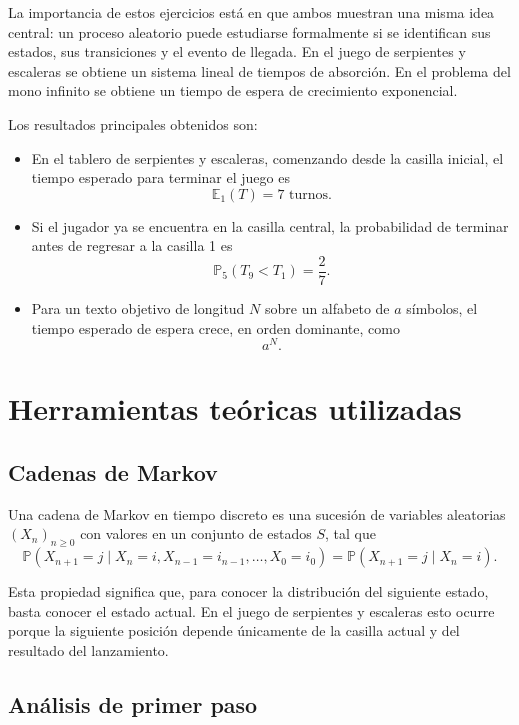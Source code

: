 \documentclass[12pt,a4paper]{article}
\newcommand{\E}{\mathbb{E}}
\newcommand{\Prob}{\mathbb{P}}
\theoremstyle{definition}
\begin{document}
La importancia de estos ejercicios está en que ambos muestran una misma idea central: un proceso aleatorio puede estudiarse formalmente si se identifican sus estados, sus transiciones y el evento de llegada. En el juego de serpientes y escaleras se obtiene un sistema lineal de tiempos de absorción. En el problema del mono infinito se obtiene un tiempo de espera de crecimiento exponencial.

\begin{cajaResumen}
Los resultados principales obtenidos son:
\begin{itemize}[leftmargin=1.1cm]
    \item En el tablero de serpientes y escaleras, comenzando desde la casilla inicial, el tiempo esperado para terminar el juego es
    \[
        \boxed{\E_1(T)=7\text{ turnos}.}
    \]
    \item Si el jugador ya se encuentra en la casilla central, la probabilidad de terminar antes de regresar a la casilla 1 es
    \[
        \boxed{\Prob_5(T_9<T_1)=\frac{2}{7}.}
    \]
    \item Para un texto objetivo de longitud \(N\) sobre un alfabeto de \(a\) símbolos, el tiempo esperado de espera crece, en orden dominante, como
    \[
        \boxed{a^N}. 
    \]
\end{itemize}
\end{cajaResumen}

\section{Herramientas teóricas utilizadas}

\subsection{Cadenas de Markov}

Una cadena de Markov en tiempo discreto es una sucesión de variables aleatorias \((X_n)_{n\geq 0}\) con valores en un conjunto de estados \(S\), tal que
\[
\Prob(X_{n+1}=j\mid X_n=i,X_{n-1}=i_{n-1},\ldots,X_0=i_0)
=
\Prob(X_{n+1}=j\mid X_n=i).
\]

Esta propiedad significa que, para conocer la distribución del siguiente estado, basta conocer el estado actual. En el juego de serpientes y escaleras esto ocurre porque la siguiente posición depende únicamente de la casilla actual y del resultado del lanzamiento.

\subsection{Análisis de primer paso}
\end{document}
